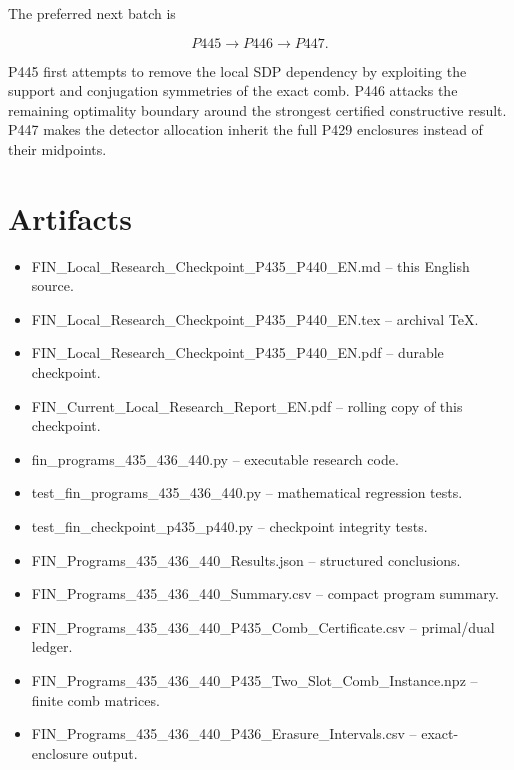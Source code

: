 \documentclass[11pt,a4paper,openany]{report}
\begin{document}
The preferred next batch is

\[
\boxed{P445\to P446\to P447.}
\]

P445 first attempts to remove the local SDP dependency by exploiting the support and conjugation symmetries of the exact comb. P446 attacks the remaining optimality boundary around the strongest certified constructive result. P447 makes the detector allocation inherit the full P429 enclosures instead of their midpoints.

\chapter{Artifacts}

\begin{itemize}
\item 
FIN\_Local\_Research\_Checkpoint\_P435\_P440\_EN.md -- this English source.

\item 
FIN\_Local\_Research\_Checkpoint\_P435\_P440\_EN.tex -- archival TeX.

\item 
FIN\_Local\_Research\_Checkpoint\_P435\_P440\_EN.pdf -- durable checkpoint.

\item 
FIN\_Current\_Local\_Research\_Report\_EN.pdf -- rolling copy of this checkpoint.

\item 
fin\_programs\_435\_436\_440.py -- executable research code.

\item 
test\_fin\_programs\_435\_436\_440.py -- mathematical regression tests.

\item 
test\_fin\_checkpoint\_p435\_p440.py -- checkpoint integrity tests.

\item 
FIN\_Programs\_435\_436\_440\_Results.json -- structured conclusions.

\item 
FIN\_Programs\_435\_436\_440\_Summary.csv -- compact program summary.

\item 
FIN\_Programs\_435\_436\_440\_P435\_Comb\_Certificate.csv -- primal/\allowbreak{}dual ledger.

\item 
FIN\_Programs\_435\_436\_440\_P435\_Two\_Slot\_Comb\_Instance.npz -- finite comb matrices.

\item 
FIN\_Programs\_435\_436\_440\_P436\_Erasure\_Intervals.csv -- exact-enclosure output.


\end{itemize}
\end{document}
